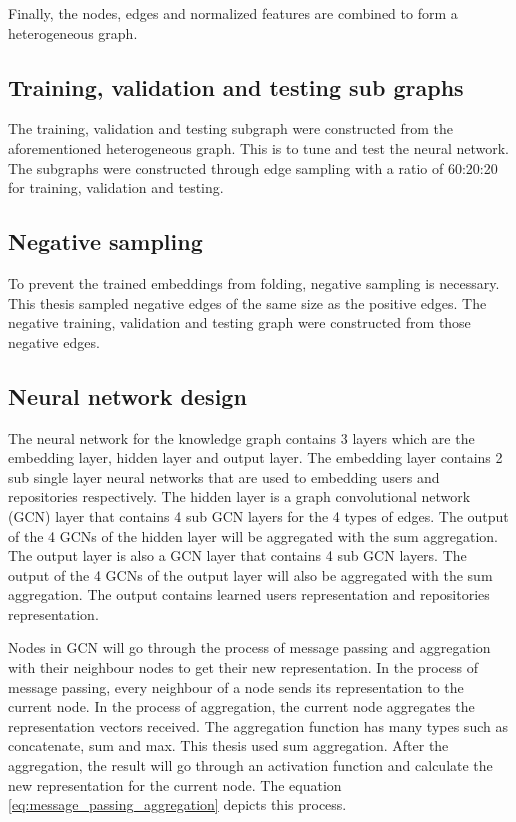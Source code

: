 \documentclass[11pt,twoside]{report}
\begin{document}
Finally, the nodes, edges and normalized features are combined to form a heterogeneous graph.

\subsection{Training, validation and testing sub graphs}
The training, validation and testing subgraph were constructed from the aforementioned heterogeneous graph. This is to tune and test the neural network. The subgraphs were constructed through edge sampling with a ratio of 60:20:20 for training, validation and testing.

\subsection{Negative sampling}
To prevent the trained embeddings from folding, negative sampling is necessary. This thesis sampled negative edges of the same size as the positive edges. The negative training, validation and testing graph were constructed from those negative edges.

\subsection{Neural network design}
The neural network for the knowledge graph contains 3 layers which are the embedding layer, hidden layer and output layer. The embedding layer contains 2 sub single layer neural networks that are used to embedding users and repositories respectively. The hidden layer is a graph convolutional network (GCN) \cite{kipf_semi-supervised_2017} layer that contains 4 sub GCN layers for the 4 types of edges. The output of the 4 GCNs of the hidden layer will be aggregated with the sum aggregation. The output layer is also a GCN layer that contains 4 sub GCN layers. The output of the 4 GCNs of the output layer will also be aggregated with the sum aggregation. The output contains learned users representation and repositories representation.

Nodes in GCN will go through the process of message passing and aggregation with their neighbour nodes to get their new representation. In the process of message passing, every neighbour of a node sends its representation to the current node. In the process of aggregation, the current node aggregates the representation vectors received. The aggregation function has many types such as concatenate, sum and max. This thesis used sum aggregation. After the aggregation, the result will go through an activation function and calculate the new representation for the current node. The equation \ref{eq:message_passing_aggregation} depicts this process.
\end{document}
